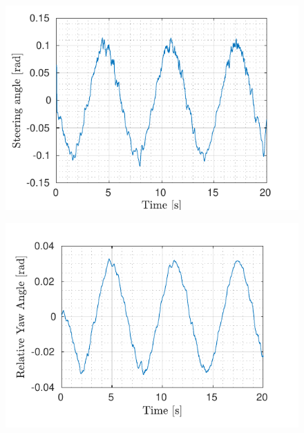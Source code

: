 \begin{figure}[!h]
\begin{minipage}[t]{0.49\textwidth}
		\includegraphics[width=\textwidth]{../../MATLAB/lane_following/figure/SteeringAngleVsTime.pdf}
		\label{fig:steering_laneFollowing}
	\end{minipage}
	\begin{minipage}[t]{0.49\textwidth}
		\includegraphics[width=\textwidth]{../../MATLAB/lane_following/figure/RelativeYawAngleVsTime.pdf}
		\label{fig:relative_yaw_angle_laneFollowing}
	\end{minipage}
	\begin{minipage}[t]{0.49\textwidth}

\end{minipage}
\end{figure}
